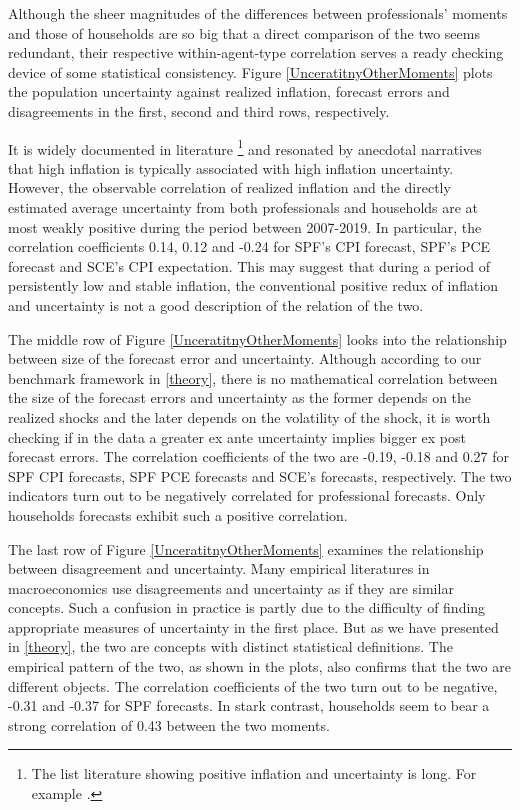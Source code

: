 \documentclass[12pt]{article}
\begin{document}
	Although the sheer magnitudes of the differences between professionals' moments and those of households are so big that a direct comparison of the two seems redundant, their respective within-agent-type correlation serves a ready checking device of some statistical consistency. Figure \ref{UnceratitnyOtherMoments} plots the population uncertainty against realized inflation,  forecast errors and disagreements in the first, second and third rows, respectively. 
	
	It is widely documented in literature \footnote{The list literature showing positive inflation and uncertainty is long. For example \citet{ball1990inflation}. } and resonated by anecdotal narratives that high inflation is typically associated with high inflation uncertainty. However, the observable correlation of realized inflation and the directly estimated average uncertainty from both professionals and households are at most weakly positive during the period between 2007-2019. In particular, the correlation coefficients  0.14, 0.12 and -0.24 for SPF's CPI forecast, SPF's PCE forecast and SCE's CPI expectation. This may suggest that during a period of persistently low and stable inflation, the conventional positive redux of inflation and uncertainty is not a good description of the relation of the two. 
	
	The middle row of Figure \ref{UnceratitnyOtherMoments} looks into the relationship between size of the forecast error and uncertainty. Although according to our benchmark framework in \ref{theory}, there is no mathematical correlation between the size of the forecast errors and uncertainty as the former depends on the realized shocks and the later depends on the volatility of the shock, it is worth checking if in the data a greater ex ante uncertainty implies bigger ex post forecast errors. The correlation coefficients of the two are -0.19, -0.18 and 0.27 for SPF CPI forecasts, SPF PCE forecasts and SCE's forecasts, respectively. The two indicators turn out to be negatively correlated for professional forecasts. Only households forecasts exhibit such a positive correlation.   
	
	The last row of Figure \ref{UnceratitnyOtherMoments} examines the relationship between disagreement and uncertainty. Many empirical literatures in macroeconomics use disagreements and uncertainty as if they are similar concepts. Such a confusion in practice is partly due to the difficulty of finding appropriate measures of uncertainty in the first place. But as we have presented in \ref{theory}, the two are concepts with distinct statistical definitions. The empirical pattern of the two,  as shown in the plots, also confirms that the two are different objects. The correlation coefficients of the two turn out to be negative, -0.31 and -0.37 for SPF forecasts. In stark contrast, households seem to bear a strong correlation of 0.43 between the two moments.  
	
\end{document}
